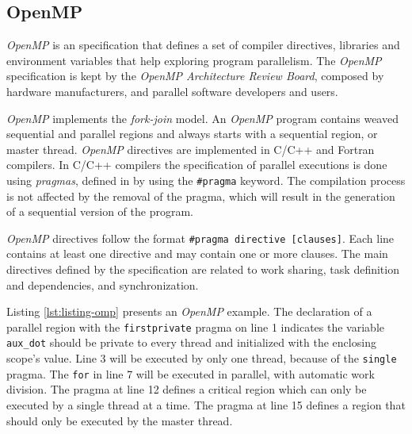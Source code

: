 \subsection{OpenMP}

\textit{OpenMP} is an specification that defines a set of compiler directives,
libraries and environment variables that help exploring program parallelism.
The \textit{OpenMP} specification is kept by the \textit{OpenMP Architecture
Review Board}, composed by hardware manufacturers, and parallel software
developers and users.

\textit{OpenMP} implements the \textit{fork-join} model. An \textit{OpenMP}
program contains weaved sequential and parallel regions and always starts with
a sequential region, or master thread.  \textit{OpenMP} directives are
implemented in C/C++ and Fortran compilers. In C/C++ compilers the
specification of parallel executions is done using \textit{pragmas}, defined in
by using the \texttt{\#pragma} keyword.
The compilation process is not affected by the removal of the pragma,
which will result in the generation of a sequential version of the program.

\textit{OpenMP} directives follow the format \texttt{\#pragma directive
[clauses]}.  Each line contains at least one directive and may contain one or
more clauses. The main directives defined by the specification are related
to work sharing, task definition and dependencies, and synchronization.

Listing \ref{lst:listing-omp} presents an \textit{OpenMP} example. The
declaration of a parallel region with the \texttt{firstprivate} pragma on line
1 indicates the variable \texttt{aux\_dot} should be private to every thread
and initialized with the enclosing scope's value.  Line 3 will be executed by
only one thread, because of the \texttt{single} pragma.
The \texttt{for} in line 7 will be executed in parallel, with automatic work
division.  The pragma at line 12 defines a critical region which can only be
executed by a single thread at a time. The pragma at line 15 defines a
region that should only be executed by the master thread.

